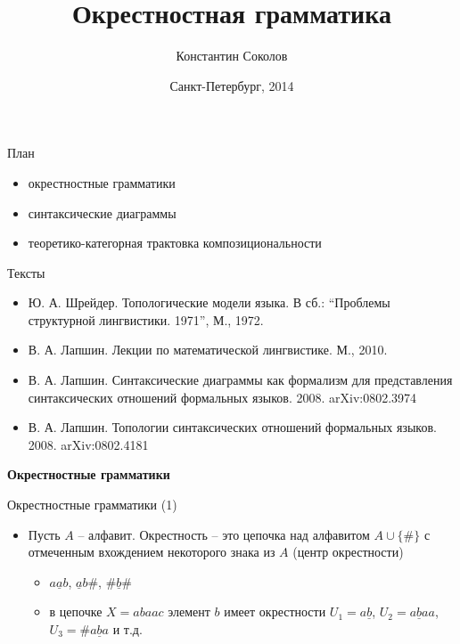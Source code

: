 \documentclass{beamer}
\begin{document}
\title{\Large{Окрестностная грамматика}}
\author{Константин Соколов}
\date{Санкт-Петербург, 2014} 
\begin{frame}
    \thispagestyle{empty}
    \titlepage
\end{frame}

\begin{frame}{План}
\setcounter{framenumber}{1}
    \begin{itemize}
		\item окрестностные грамматики
		\item синтаксические диаграммы
		\item теоретико-категорная трактовка композициональности
    \end{itemize}
\end{frame}

\begin{frame}{Тексты}
\begin{itemize}
	\item Ю. А. Шрейдер. Топологические модели языка. В сб.: ``Проблемы структурной лингвистики. 1971'', М., 1972.
	\item В. А. Лапшин. Лекции по математической лингвистике. М., 2010.
	\item В. А. Лапшин. Синтаксические диаграммы как формализм для представления синтаксических отношений формальных языков. 2008.  	arXiv:0802.3974
	\item В. А. Лапшин. Топологии синтаксических отношений формальных языков. 2008. arXiv:0802.4181
\end{itemize}
\end{frame}



\begin{frame}{}
\begin{center}
	\textbf{Окрестностные грамматики}
\end{center}
\end{frame}

\begin{frame}{Окрестностные грамматики (1)}
\begin{small}
\begin{itemize}
	\item Пусть $A$ -- алфавит. Окрестность -- это цепочка над алфавитом $A \cup \{ \# \}$ с отмеченным вхождением некоторого знака из $A$ (центр окрестности)
		\begin{itemize}
			\item $a\underline{a}b$, $\underline{a}b\#$, $\#\underline{b}\#$
			\item в цепочке $X = abaac$ элемент $b$ имеет окрестности $U_1 = a\underline{b}$, $U_2 = a\underline{b}aa$, $U_3 = \#a\underline{b}a$ и т.д.
		\end{itemize}
\end{itemize}
\end{small}
\end{frame}
\end{document}
